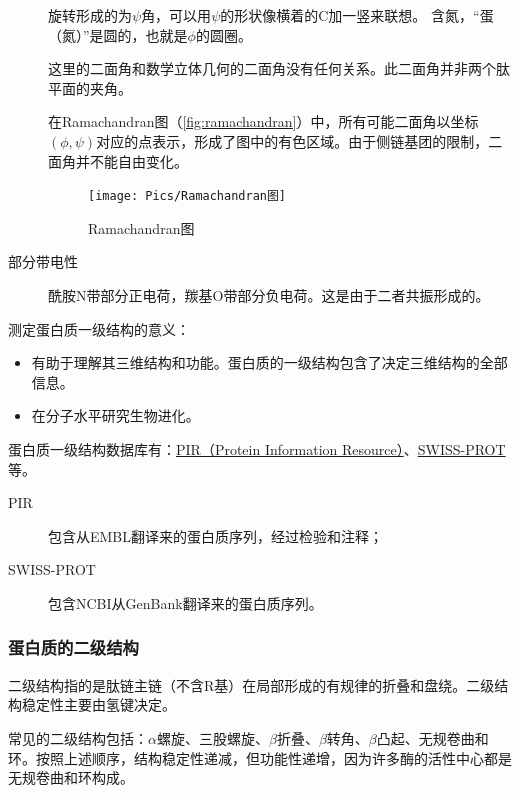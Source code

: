 \begin{description}
	\begin{qj}
		旋转形成的为$\psi$角，可以用$\psi$的形状像横着的C加一竖来联想。
		含氮，“蛋（氮）”是圆的，也就是$\phi$的圆圈。
	\end{qj}

	\begin{tx}[：此二面角非彼二面角]
		这里的二面角和数学立体几何的二面角没有任何关系。此二面角并非两个肽平面的夹角。
	\end{tx}

	在Ramachandran图（\autoref{fig:ramachandran}）中，所有可能二面角以坐标$(\phi,\psi)$对应的点表示，形成了图中的有色区域。由于侧链基团的限制，二面角并不能自由变化。

	\begin{figure}[htbp]
		\centering
		\texttt{[image: Pics/Ramachandran图]}
		\caption{Ramachandran图}
		\label{fig:ramachandran}
	\end{figure}

	\item[部分带电性] 酰胺N带部分正电荷，羰基O带部分负电荷。这是由于二者共振形成的。
\end{description}

\mbox{}

测定蛋白质一级结构的意义：
\begin{itemize}
	\item 有助于理解其三维结构和功能。蛋白质的一级结构包含了决定三维结构的全部信息。
	\item 在分子水平研究生物进化。
\end{itemize}

蛋白质一级结构数据库有：\href{https://cn.expasy.org}{PIR（Protein Information Resource）}、\href{https://www-nbrf.geogetown.edu}{SWISS-PROT}等。
\begin{description}
	\item[PIR] 包含从EMBL翻译来的蛋白质序列，经过检验和注释；
	\item[SWISS-PROT] 包含NCBI从GenBank翻译来的蛋白质序列。
\end{description}

\subsubsection{蛋白质的二级结构}

二级结构指的是肽链主链（不含R基）在局部形成的有规律的折叠和盘绕。二级结构稳定性主要由氢键决定。

常见的二级结构包括：$\alpha$螺旋、三股螺旋、$\beta$折叠、$\beta$转角、$\beta$凸起、无规卷曲和环。按照上述顺序，结构稳定性递减，但功能性递增，因为许多酶的活性中心都是无规卷曲和环构成。

